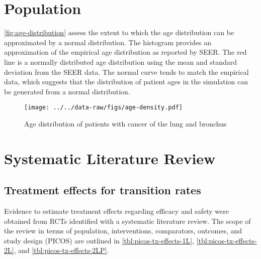 \documentclass[11pt,final,fleqn]{article}\usepackage[]{graphicx}\usepackage[]{color}
\theoremstyle{plain}
\begin{document}
\begin{appendices}
\setcounter{table}{0}
\renewcommand{\thetable}{A\arabic{table}}
\setcounter{figure}{0}
\renewcommand{\thefigure}{A\arabic{figure}}
\setcounter{equation}{0}
\renewcommand{\theequation}{A\arabic{equation}}

\section{Population}\label{app:pop}
\autoref{fig:age-distribution} assess the extent to which the age distribution can be approximated by a normal distribution. The histogram provides an approximation of the empirical age distribution as reported by SEER. The red line is a normally distributed age distribution using the mean and standard deviation from the SEER data. The normal curve tends to match the empirical data, which suggests that the distribution of patient ages in the simulation can be generated from a normal distribution.

\begin{figure}
\centering
\texttt{[image: ../../data-raw/figs/age-density.pdf]}
\caption{Age distribution of patients with cancer of the lung and bronchus}\label{fig:age-distribution}
\end{figure}

\FloatBarrier

\section{Systematic Literature Review}\label{app:slr}

\subsection{Treatment effects for transition rates}
Evidence to estimate treatment effects regarding efficacy and safety were obtained from RCTs identified with a systematic literature review. The scope of the review in terms of population, interventions, comparators, outcomes, and study design (PICOS) are outlined in \autoref{tbl:picos-tx-effects-1L}, \autoref{tbl:picos-tx-effects-2L}, and \autoref{tbl:picos-tx-effects-2LP}. 


\end{appendices}
\end{document}
